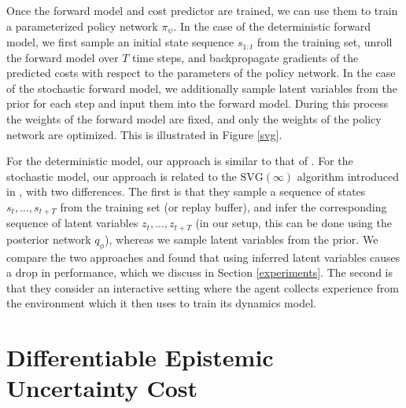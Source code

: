\documentclass{article} %
\begin{document}
Once the forward model and cost predictor are trained, we can use them to train a parameterized policy network $\pi_\psi$.
In the case of the deterministic forward model, we first sample an initial state sequence $s_{1:t}$ from the training set, unroll the forward model over $T$ time steps, and backpropagate gradients of the predicted costs with respect to the parameters of the policy network.
In the case of the stochastic forward model, we additionally sample latent variables from the prior for each step and input them into the forward model.
During this process the weights of the forward model are fixed, and only the weights of the policy network are optimized. This is illustrated in Figure \ref{svg}.

    For the deterministic model, our approach is similar to that of \citep{Nguyen1989}.
    For the stochastic model, our approach is related to the $\mbox{SVG}(\infty)$ algorithm introduced in \citep{SVG}, with two differences. The first is that they sample a sequence of states $s_t, ..., s_{t+T}$ from the training set (or replay buffer), and infer the corresponding sequence of latent variables $z_t, ..., z_{t+T}$ (in our setup, this can be done using the posterior network $q_\phi$), whereas we sample latent variables from the prior. We compare the two approaches and found that using inferred latent variables causes a drop in performance, which we discuss in Section \ref{experiments}.
    The second is that they consider an interactive setting where the agent collects experience from the environment which it then uses to train its dynamics model.






    \section{Differentiable Epistemic Uncertainty Cost}
    \label{uncertainty-cost}
\end{document}
